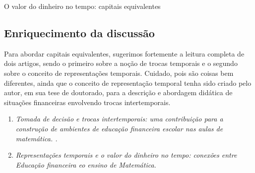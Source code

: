 \begin{paginatexto}{O valor do dinheiro no tempo: capitais equivalentes}
\subsection*{Enriquecimento da discussão}

Para abordar capitais equivalentes, sugerimos fortemente a leitura completa de dois artigos, sendo o primeiro sobre a noção de trocas temporais e o segundo sobre o conceito de representações temporais. Cuidado, pois são coisas bem diferentes, ainda que o conceito de representação temporal tenha sido criado pelo autor, em sua tese de doutorado, para a descrição e abordagem didática de situações financeiras envolvendo trocas intertemporais.

\begin{enumerate}
  \item \textit{Tomada de decisão e trocas intertemporais: uma contribuição para a construção de ambientes de educação financeira escolar nas aulas de matemática. \citep{muniz2016c}.}

  \item \textit{Representações temporais e o valor do dinheiro no tempo: conexões entre Educação financeira eo ensino de Matemática.}
\end{enumerate}


\end{paginatexto}
